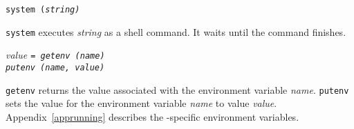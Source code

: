 \begin{flushleft}
\tt system (\it string\tt )\\
\end{flushleft}\vspace{-2\itemsep}
{\tt system} executes {\it string} as a shell command. It waits until the
command finishes.

\begin{flushleft}
\it value \tt = getenv (\it name\tt )\\
\tt putenv (\it name, value\tt )\\
\end{flushleft}\vspace{-2\itemsep}
{\tt getenv} returns the value associated with the environment variable
{\it name}. {\tt putenv} sets the value for the environment variable
{\it name} to value {\it value}. Appendix~\ref{apprunning} describes the
{\LEFTY}-specific environment variables.
